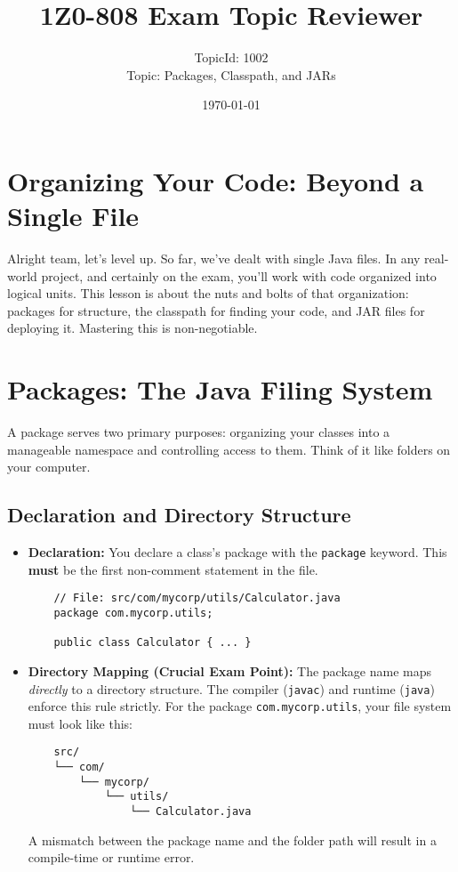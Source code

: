 \documentclass[12pt]{article}
\title{\textbf{1Z0-808 Exam Topic Reviewer}}
\author{TopicId: 1002 \\ Topic: Packages, Classpath, and JARs}
\date{\today}
\begin{document}
\maketitle
\newpage\begin{enumerate}[label=(\arabic*)]
\section*{Organizing Your Code: Beyond a Single File}
Alright team, let's level up. So far, we've dealt with single Java files. In any real-world project, and certainly on the exam, you'll work with code organized into logical units. This lesson is about the nuts and bolts of that organization: packages for structure, the classpath for finding your code, and JAR files for deploying it. Mastering this is non-negotiable.

\section{Packages: The Java Filing System}
A package serves two primary purposes: organizing your classes into a manageable namespace and controlling access to them. Think of it like folders on your computer.

\subsection{Declaration and Directory Structure}
\begin{itemize}
    \item \textbf{Declaration:} You declare a class's package with the \texttt{package} keyword. This \textbf{must} be the first non-comment statement in the file.
    \begin{verbatim}
    // File: src/com/mycorp/utils/Calculator.java
    package com.mycorp.utils;

    public class Calculator { ... }
    \end{verbatim}

    \item \textbf{Directory Mapping (Crucial Exam Point):} The package name maps \textit{directly} to a directory structure. The compiler (\texttt{javac}) and runtime (\texttt{java}) enforce this rule strictly. For the package \texttt{com.mycorp.utils}, your file system must look like this:
    \begin{verbatim}
    src/
    └── com/
        └── mycorp/
            └── utils/
                └── Calculator.java
    \end{verbatim}
    A mismatch between the package name and the folder path will result in a compile-time or runtime error.
\end{itemize}


\end{enumerate}
\end{document}
